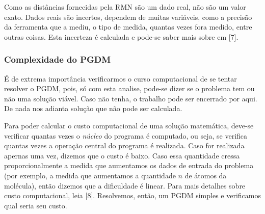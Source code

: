 \documentclass[a4paper,12pt]{article}
\begin{document}
	Como as distâncias fornecidas pela RMN são um dado real, não são um valor exato. Dados reais são incertos, dependem de muitas variáveis, como a precisão da ferramenta que a mediu, o tipo de medida, quantas vezes fora medido, entre outras coisas. Esta incerteza é calculada e pode-se saber mais sobre em [7].
	
	\subsubsection*{Complexidade do PGDM}
	É de extrema importância verificarmos o curso computacional de se tentar resolver o PGDM, pois, só com esta analise, pode-se dizer se o problema tem ou não uma solução viável. Caso não tenha, o trabalho pode ser encerrado por aqui. De nada nos adianta solução que não pode ser calculada.
	
	Para poder calcular o custo computacional de uma solução matemática, deve-se verificar quantas vezes o \textit{núcleo} do programa é computado, ou seja, se verifica quantas vezes a operação central do programa é realizada. Caso for realizada apernas uma vez, dizemos que o custo é baixo. Caso essa quantidade cressa proporcionalmente a medida que aumentamos os dados de entrada do problema (por exemplo, a medida que aumentamos a quantidade $n$ de átomos da molécula), então dizemos que a dificuldade é linear. Para mais detalhes sobre custo computacional, leia [8]. Resolvemos, então, um PGDM simples e verificamos qual seria seu custo.
	
\end{document}
